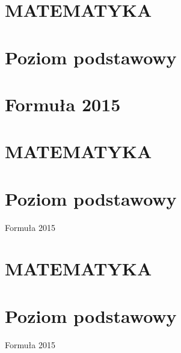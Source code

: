 \documentclass[10pt]{article}
\begin{document}
\section*{MATEMATYKA}
\section*{Poziom podstawowy}
\section*{Formuła 2015}
\section*{MATEMATYKA}
\section*{Poziom podstawowy}
Formuła 2015

\section*{MATEMATYKA}
\section*{Poziom podstawowy}
Formuła 2015
\end{document}

